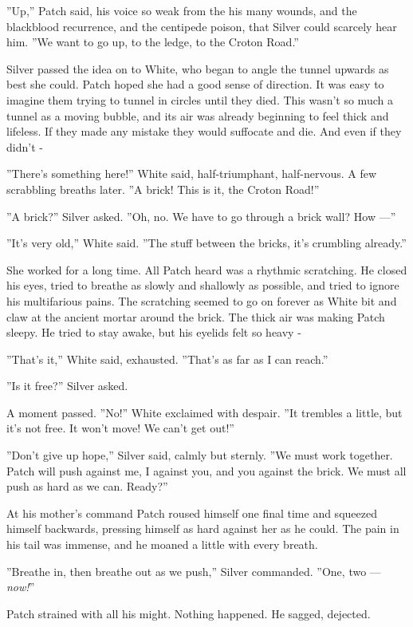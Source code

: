 \documentclass[12pt]{book}
\begin{document}
''Up,'' Patch said, his voice so weak from the his many wounds, and
the blackblood recurrence, and the centipede poison, that Silver could
scarcely hear him. ''We want to go up, to the ledge, to the Croton
Road.''

Silver passed the idea on to White, who began to angle the tunnel
upwards as best she could. Patch hoped she had a good sense of
direction. It was easy to imagine them trying to tunnel in circles
until they died. This wasn't so much a tunnel as a moving bubble, and
its air was already beginning to feel thick and lifeless. If they made
any mistake they would suffocate and die. And even if they didn't -

''There's something here!'' White said, half-triumphant,
half-nervous. A few scrabbling breaths later. ''A brick! This is it,
the Croton Road!''

''A brick?'' Silver asked. ''Oh, no. We have to go through a brick
wall? How ---''

''It's very old,'' White said. ''The stuff between the bricks, it's
crumbling already.''

She worked for a long time. All Patch heard was a rhythmic
scratching. He closed his eyes, tried to breathe as slowly and
shallowly as possible, and tried to ignore his multifarious pains. The
scratching seemed to go on forever as White bit and claw at the
ancient mortar around the brick. The thick air was making Patch
sleepy. He tried to stay awake, but his eyelids felt so heavy -

''That's it,'' White said, exhausted. ''That's as far as I can
reach.''

''Is it free?'' Silver asked.

A moment passed. ''No!'' White exclaimed with despair. ''It trembles a
little, but it's not free. It won't move! We can't get out!''

''Don't give up hope,'' Silver said, calmly but sternly. ''We must
work together. Patch will push against me, I against you, and you
against the brick. We must all push as hard as we can. Ready?''

At his mother's command Patch roused himself one final time and
squeezed himself backwards, pressing himself as hard against her as he
could. The pain in his tail was immense, and he moaned a little with
every breath.

''Breathe in, then breathe out as we push,'' Silver commanded. ''One,
two --- \textit{now!}''

Patch strained with all his might. Nothing happened. He sagged,
dejected.
\end{document}

